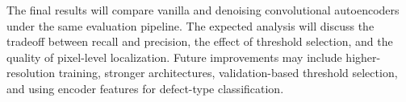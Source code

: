 \documentclass[conference]{IEEEtran}
\begin{document}
The final results will compare vanilla and denoising convolutional autoencoders under the same evaluation pipeline. The expected analysis will discuss the tradeoff between recall and precision, the effect of threshold selection, and the quality of pixel-level localization. Future improvements may include higher-resolution training, stronger architectures, validation-based threshold selection, and using encoder features for defect-type classification.



\end{document}
